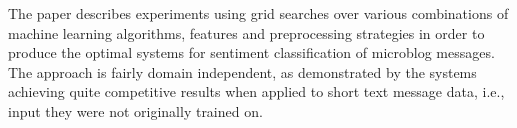 The paper describes experiments using grid searches over various combinations of machine learning algorithms, features and preprocessing strategies in order
 to produce the optimal systems for sentiment classification of microblog
 messages.
 The approach is fairly domain independent, as demonstrated by the systems
 achieving quite competitive results when applied to short text message data,
 i.e., input they were not originally trained on.

